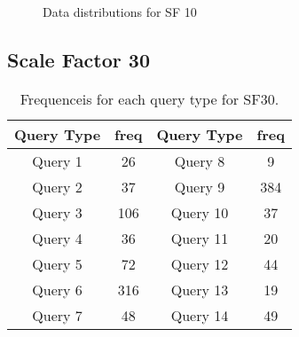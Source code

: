 \begin{figure}[H]
\begin{center}
  \caption{Data distributions for SF 10}
  \label{fig:datadistSF10}
\end{center}
\end{figure}

\subsection{Scale Factor 30}

\begin{table}[H]
\centering
    \begin{tabular}{|c|c|c|c|}
    \hline
    Query Type & freq & Query Type & freq \\ 
    \hline
    \hline
    Query 1 & 26 & Query 8 & 9 \\ 
    \hline       
    Query 2 & 37 & Query 9 & 384 \\  
    \hline        
    Query 3 & 106 & Query 10 & 37 \\ 
    \hline       
    Query 4 & 36 & Query 11 & 20 \\ 
    \hline        
    Query 5 & 72 & Query 12 & 44 \\ 
    \hline        
    Query 6 & 316 & Query 13 & 19 \\  
    \hline        
    Query 7 & 48 & Query 14 & 49 \\ 
    \hline
    \end{tabular}
    \caption{Frequenceis for each query type for SF30.}
    \label{table:freqs_sf30}
\end{table}

